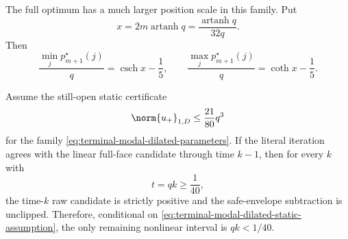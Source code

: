 The full optimum has a much larger position scale in this family.  Put
\begin{equation}
 x=2m\operatorname{artanh}q
   =\frac{\operatorname{artanh}q}{32q}.
 \label{eq:terminal-modal-dilated-x}
\end{equation}
Then
\begin{equation}
 \frac{\min_jp_{m+1}^\star(j)}q=\operatorname{csch}x-\frac15,
 \qquad
 \frac{\max_jp_{m+1}^\star(j)}q=\operatorname{coth}x-\frac15.
 \label{eq:terminal-modal-dilated-optimum-extrema}
\end{equation}

\begin{lemma}
\label{lem:terminal-modal-dilated-late-bridge}
Assume the still-open static certificate
\begin{equation}
 \norm{u_+}_{1,D}\le\frac{21}{80}q^3
 \label{eq:terminal-modal-dilated-static-assumption}
\end{equation}
for the family \eqref{eq:terminal-modal-dilated-parameters}.  If the literal
iteration agrees with the linear full-face candidate through time $k-1$, then
for every $k$ with
\begin{equation}
 t=qk\ge\frac1{40},
\end{equation}
the time-$k$ raw candidate is strictly positive and the safe-envelope
subtraction is unclipped.  Therefore, conditional on
\eqref{eq:terminal-modal-dilated-static-assumption}, the only remaining
nonlinear interval is $qk<1/40$.
\end{lemma}

